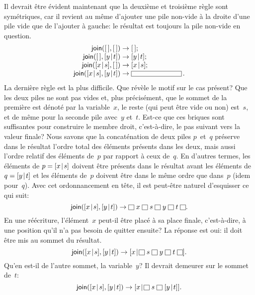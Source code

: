 Il devrait être évident maintenant que la deuxième et troisième règle
sont symétriques, car il revient au même d'ajouter une pile non-vide à
la droite d'une pile vide que de l'ajouter à gauche: le résultat
est toujours la pile non-vide en question.
\begin{equation*}
\begin{array}{r@{\;}l@{\;}l}
\fun{join}(\el,\el) & \rightarrow & \el;\\
\fun{join}(\el,\cons{y}{t}) & \rightarrow & \cons{y}{t};\\
\fun{join}(\cons{x}{s},\el) & \rightarrow & \cons{x}{s};\\
\fun{join}(\cons{x}{s},\cons{y}{t}) & \rightarrow & \fbcode{CCCCCCCCCC}\,.
\end{array}
\end{equation*}
La dernière règle est la plus difficile. Que révèle le motif sur le
cas présent? Que les deux piles ne sont pas vides et, plus
précisément, que le sommet de la première est dénoté par la
variable~\(x\), le reste (qui peut être vide ou non) est~\(s\), et de
même pour la seconde pile avec~\(y\) et~\(t\). Est-ce que ces briques
sont suffisantes pour construire le membre droit, c'est-à-dire, le pas
suivant vers la valeur finale? Nous savons que la concaténation de
deux piles \(p\)~et~\(q\) préserve dans le résultat l'ordre total des
éléments présents dans les deux, mais aussi l'ordre relatif des
éléments de~\(p\) par rapport à ceux de~\(q\). En d'autres termes, les
éléments de \(p=[{x}\!\mid\!{s}]\) doivent être présents dans le résultat
avant les éléments de \(q=[{y}\!\mid\!{t}]\) et les éléments de~\(p\)
doivent être dans le même ordre que dans~\(p\) (idem pour~\(q\)). Avec
cet ordonnancement en tête, il est peut-être naturel d'esquisser ce
qui suit:
\begin{equation*}
\fun{join}(\cons{x}{s},\cons{y}{t}) \rightarrow \fbcode{II} \; x \;
\fbcode{II} \; s \; \fbcode{II} \; y \; \fbcode{II} \; t \; \fbcode{II}.
\end{equation*}
En une réécriture, l'élément~\(x\) peut-il être placé à sa place
finale, c'est-à-dire, à une position qu'il n'a pas besoin de quitter
ensuite? La réponse est oui: il doit être mis au sommet du résultat.
\begin{equation*}
\fun{join}(\cons{x}{s},\cons{y}{t}) \rightarrow \cons{x}{\fbcode{II}
  \; s \; \fbcode{II} \; y \; \fbcode{II} \; t \; \fbcode{II}}.
\end{equation*}
Qu'en est-il de l'autre sommet, la variable~\(y\)? Il devrait demeurer
sur le sommet de~\(t\):
\begin{equation*}
\fun{join}(\cons{x}{s},\cons{y}{t}) \rightarrow \cons{x}{\fbcode{II}
  \; s \; \fbcode{II} \; \cons{y}{t}}.
\end{equation*}
